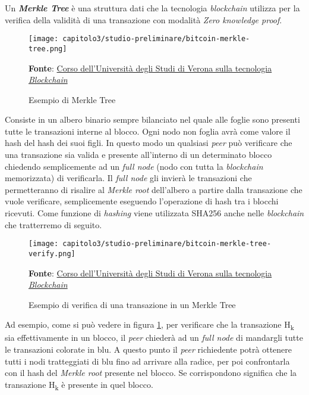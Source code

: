 Un \textbf{\textit{Merkle Tree}} è una struttura dati che la tecnologia \textit{blockchain} utilizza per la verifica della validità di una transazione con modalità \textit{Zero knowledge proof}.

\clearpage
\begin{figure}[h!]
  \centering
  \texttt{[image: capitolo3/studio-preliminare/bitcoin-merkle-tree.png]}
  \caption{Esempio di Merkle Tree}
  \textbf{Fonte}: \href{https://github.com/spoto/blockchain-course}{Corso dell'Università degli Studi di Verona sulla tecnologia \textit{Blockchain}}
\end{figure}

Consiste in un albero binario sempre bilanciato nel quale alle foglie sono presenti tutte le transazioni interne al blocco. Ogni nodo non foglia avrà come valore il hash del hash dei suoi figli. In questo modo un qualsiasi \textit{peer} può verificare che una transazione sia valida e presente all'interno di un determinato blocco chiedendo semplicemente ad un \textit{full node} (nodo con tutta la \textit{blockchain} memorizzata) di verificarla. Il \textit{full node} gli invierà le transazioni che permetteranno di risalire al \textit{Merkle root} dell'albero a partire dalla transazione che vuole verificare, semplicemente eseguendo l'operazione di hash tra i blocchi ricevuti. Come funzione di \textit{hashing} viene utilizzata SHA256 anche nelle \textit{blockchain} che tratterremo di seguito.

\begin{figure}[h!]
  \centering
  \texttt{[image: capitolo3/studio-preliminare/bitcoin-merkle-tree-verify.png]}
  \caption{Esempio di verifica di una transazione in un Merkle Tree}
  \textbf{Fonte}: \href{https://github.com/spoto/blockchain-course}{Corso dell'Università degli Studi di Verona sulla tecnologia \textit{Blockchain}}
  \label{fig:merkle-tree-verify}
\end{figure}

Ad esempio, come si può vedere in figura \ref{fig:merkle-tree-verify}, per verificare che la transazione H\textsubscript{k} sia effettivamente in un blocco, il \textit{peer} chiederà ad un \textit{full node} di mandargli tutte le transazioni colorate in blu. A questo punto il \textit{peer} richiedente potrà ottenere tutti i nodi tratteggiati di blu fino ad arrivare alla radice, per poi confrontarla con il hash del \textit{Merkle root} presente nel blocco. Se corrispondono significa che la transazione H\textsubscript{k} è presente in quel blocco. 

